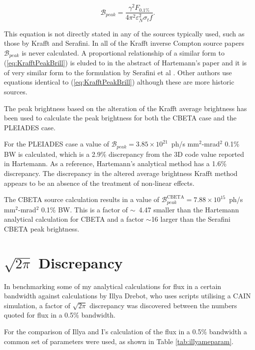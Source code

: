 \documentclass[10pt]{article}
\begin{document}
\begin{equation}
\mathcal{B}_{peak} = \frac{\gamma^{2}F_{0.1\%}}{4\pi^{2}\varepsilon_{N}^{2}\sigma_{t}f}.
\label{eq:KrafftPeakBrill}
\end{equation}

This equation is not directly stated in any of the sources typically used, such as those by Krafft and Serafini. In all of the Krafft inverse Compton source papers $\mathcal{B}_{peak}$ is never calculated. A proportional relationship of a similar form to (\ref{eq:KrafftPeakBrill}) is eluded to in the abstract of Hartemann's paper \cite{hartemann2005high} and it is of very similar form to the formulation by Serafini et al \cite{curatolo2017analytical}. Other authors \cite{pogorelsky2000demonstration,shen2001x} use equations identical to (\ref{eq:KrafftPeakBrill}) although these are more historic sources.    

The peak brightness based on the alteration of the Krafft average brightness has been used to calculate the peak brightness for both the CBETA case and the PLEIADES case. 

For the PLEIADES case a value of $\mathcal{B}_{peak} = 3.85\times 10^{21}$~ph/s mm$^{2}$-mrad$^{2}$ 0.1\% BW is calculated, which is a 2.9\% discrepancy from the 3D code value reported in Hartemann. As a reference, Hartemann's analytical method has a 1.6\% discrepancy. The discrepancy in the altered average brightness Krafft method appears to be an absence of the treatment of non-linear effects.

The CBETA source calculation results in a value of $\mathcal{B}^{\mathrm{CBETA}}_{peak}=7.88\times 10^{15}$~ph/s mm$^{2}$-mrad$^{2}$ 0.1\% BW. This is a factor of $\sim$~4.47 smaller than the Hartemann analytical calculation for CBETA and a factor $\sim$16 larger than the Serafini CBETA peak brightness.
   
\section*{$\sqrt{2\pi}$ Discrepancy}
\label{sec:2pi}

In benchmarking some of my analytical calculations for flux in a certain bandwidth against calculations by Illya Drebot, who uses scripts utilising a CAIN simulation, a factor of $\sqrt{2\pi}$ discrepancy was discovered between the numbers quoted for flux in a 0.5\% bandwidth.

For the comparison of Illya and I's calculation of the flux in a 0.5\% bandwidth a common set of parameters were used, as shown in Table \ref{tab:illyameparam}.
\end{document}
